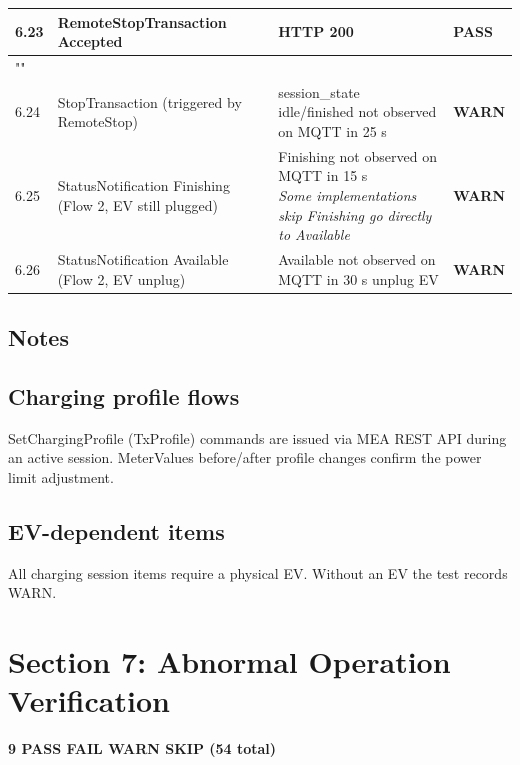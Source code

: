\documentclass[10pt, a4paper]{article}
\begin{document}
\begin{longtable}{|L{1cm}|L{5.5cm}|M{7cm}|C{1.8cm}|}
\hline
\small 6.23 & \small RemoteStopTransaction  Accepted & HTTP 200 & \textcolor{passgreen}{\textbf{PASS}} \\
\hline
{} \\
\hline
\small 6.24 & \small StopTransaction (triggered by RemoteStop) & session\_state idle/finished not observed on MQTT in 25 s & \textcolor{warnorange}{\textbf{WARN}} \\
\hline
\small 6.25 & \small StatusNotification Finishing (Flow 2, EV still plugged) & Finishing not observed on MQTT in 15 s{\newline\normalfont\footnotesize\itshape Some implementations skip Finishing  go directly to Available} & \textcolor{warnorange}{\textbf{WARN}} \\
\hline
\small 6.26 & \small StatusNotification Available (Flow 2, EV unplug) & Available not observed on MQTT in 30 s  unplug EV & \textcolor{warnorange}{\textbf{WARN}} \\
\hline
\end{longtable}
\normalsize
\subsection*{Notes}

\subsection*{Charging profile flows}
SetChargingProfile (TxProfile) commands are issued via MEA REST API during an active session.
MeterValues before/after profile changes confirm the power limit adjustment.

\subsection*{EV-dependent items}
All charging session items require a physical EV. Without an EV the test records WARN.



\newpage
\section{Section 7: Abnormal Operation Verification}
\textbf{9 PASS  FAIL  WARN  SKIP \quad (54 total)}
\end{document}
